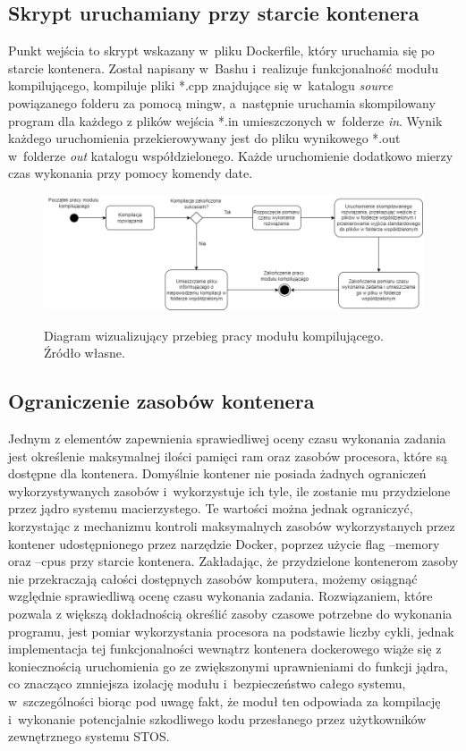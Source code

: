 \subsection{Skrypt uruchamiany przy starcie kontenera}
Punkt wejścia to skrypt wskazany w~pliku Dockerfile, który uruchamia się po starcie kontenera. Został napisany w~Bashu i~realizuje funkcjonalność modułu kompilującego, kompiluje pliki *.cpp znajdujące się w~katalogu \textit{\/source} powiązanego folderu za pomocą mingw, a~następnie uruchamia skompilowany program dla każdego z plików wejścia *.in umieszczonych w~folderze \textit{\/in}. Wynik każdego uruchomienia przekierowywany jest do pliku wynikowego *.out w~folderze \textit{\/out} katalogu współdzielonego. Każde uruchomienie dodatkowo mierzy czas wykonania przy pomocy komendy date.
\begin{figure}[!ht]
	\begin{center}
		\resizebox{1\textwidth}{!} {
			\includegraphics{img/3/diagram-aktywnosci-modul-kompilujacy.png}
		}
		\caption[Diagram aktywności modułu kompilującego]{Diagram wizualizujący przebieg pracy modułu kompilującego. Źródło własne.}
		\label{diagram-aktywnosci-worker}
	\end{center}
\end{figure}

\subsection{Ograniczenie zasobów kontenera}
Jednym z elementów zapewnienia sprawiedliwej oceny czasu wykonania zadania jest określenie maksymalnej ilości pamięci ram oraz zasobów procesora, które są dostępne dla kontenera. Domyślnie kontener nie posiada żadnych ograniczeń wykorzystywanych zasobów i~wykorzystuje ich tyle, ile zostanie mu przydzielone przez jądro systemu macierzystego. Te wartości można jednak ograniczyć, korzystając z mechanizmu kontroli maksymalnych zasobów wykorzystanych przez kontener udostępnionego przez narzędzie Docker\cite{dockerConstraints}, poprzez użycie flag --memory oraz --cpus przy starcie kontenera. Zakładając, że przydzielone kontenerom zasoby nie przekraczają całości dostępnych zasobów komputera, możemy osiągnąć względnie sprawiedliwą ocenę czasu wykonania zadania. Rozwiązaniem, które pozwala z większą dokładnością określić zasoby czasowe potrzebne do wykonania programu, jest pomiar wykorzystania procesora na podstawie liczby cykli, jednak implementacja tej funkcjonalności wewnątrz kontenera dockerowego wiąże się z koniecznością uruchomienia go ze zwiększonymi uprawnieniami do funkcji jądra, co znacząco zmniejsza izolację modułu i~bezpieczeństwo całego systemu, w~szczególności biorąc pod uwagę fakt, że moduł ten odpowiada za kompilację i~wykonanie potencjalnie szkodliwego kodu przesłanego przez użytkowników zewnętrznego systemu STOS.

